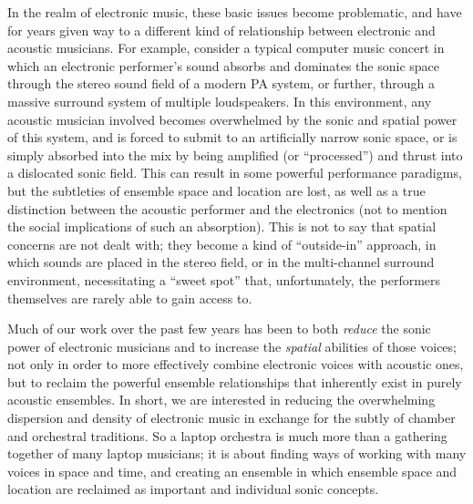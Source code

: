 In the realm of electronic music, these basic issues become problematic, and
have for years given way to a different kind of relationship between electronic
and acoustic musicians.  For example, consider a typical computer music concert
in which an electronic performer's sound absorbs and dominates the sonic space
through the stereo sound field of a modern PA system, or further, through a
massive surround system of multiple loudspeakers.  In this environment, any
acoustic musician involved becomes overwhelmed by the sonic and spatial power of
this system, and is forced to submit to an artificially narrow sonic space, or is
simply absorbed into the mix by being amplified (or ``processed'') and thrust
into a dislocated sonic field.  This can result in some powerful performance
paradigms, but the subtleties of ensemble space and location are lost, as well as
a true distinction between the acoustic performer and the electronics (not to
mention the social implications of such an absorption).  This is not to say that
spatial concerns are not dealt with; they become a kind of ``outside-in''
approach, in which sounds are placed in the stereo field, or in the multi-channel
surround environment, necessitating a ``sweet spot'' that, unfortunately, the
performers themselves are rarely able to gain access to.

Much of our work over the past few years has been to both \textit{reduce} the
sonic power of electronic musicians and to increase the \textit{spatial}
abilities of those voices; not only in order to more effectively combine
electronic voices with acoustic ones, but to reclaim the powerful ensemble
relationships that inherently exist in purely acoustic ensembles.  In short, we
are interested in reducing the overwhelming dispersion and density of electronic
music in exchange for the subtly of chamber and orchestral traditions.  So a
laptop orchestra is much more than a gathering together of many laptop musicians;
it is about finding ways of working with many voices in space and time, and
creating an ensemble in which ensemble space and location are reclaimed as
important and individual sonic concepts.


